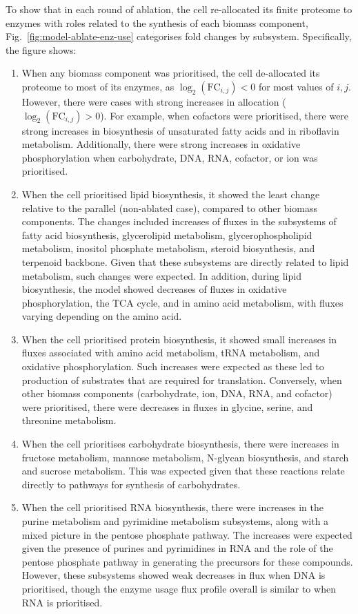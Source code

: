To show that in each round of ablation, the cell re-allocated its finite proteome to enzymes with roles related to the synthesis of each biomass component, Fig.\ \ref{fig:model-ablate-enz-use} categorises fold changes by subsystem.
Specifically, the figure shows:
\begin{enumerate}
  \item When any biomass component was prioritised, the cell de-allocated its proteome to most of its enzymes, as $\log_{2}(\mathrm{FC}_{i,j}) < 0$ for most values of $i, j$.
        However, there were cases with strong increases in allocation ($\log_{2}(\mathrm{FC}_{i,j}) > 0$).
        For example, when cofactors were prioritised, there were strong increases in biosynthesis of unsaturated fatty acids and in riboflavin metabolism.
        Additionally, there were strong increases in oxidative phosphorylation when carbohydrate, DNA, RNA, cofactor, or ion was prioritised.
  \item When the cell prioritised lipid biosynthesis, it showed the least change relative to the parallel (non-ablated case), compared to other biomass components.
        The changes included increases of fluxes in the subsystems of fatty acid biosynthesis, glycerolipid metabolism, glycerophospholipid metabolism, inositol phosphate metabolism, steroid biosynthesis, and terpenoid backbone.
        Given that these subsystems are directly related to lipid metabolism, such changes were expected.
        In addition, during lipid biosynthesis, the model showed decreases of fluxes in oxidative phosphorylation, the TCA cycle, and in amino acid metabolism, with fluxes varying depending on the amino acid.
  \item When the cell prioritised protein biosynthesis, it showed small increases in fluxes associated with amino acid metabolism, tRNA metabolism, and oxidative phosphorylation.
        Such increases were expected as these led to production of substrates that are required for translation.
        Conversely, when other biomass components (carbohydrate, ion, DNA, RNA, and cofactor) were prioritised, there were decreases in fluxes in glycine, serine, and threonine metabolism.
  \item When the cell prioritises carbohydrate biosynthesis, there were increases in fructose metabolism, mannose metabolism, N-glycan biosynthesis, and starch and sucrose metabolism.
        This was expected given that these reactions relate directly to pathways for synthesis of carbohydrates.
  \item When the cell prioritised RNA biosynthesis, there were increases in the purine metabolism and pyrimidine metabolism subsystems, along with a mixed picture in the pentose phosphate pathway.
        The increases were expected given the presence of purines and pyrimidines in RNA and the role of the pentose phosphate pathway in generating the precursors for these compounds.
        However, these subsystems showed weak decreases in flux when DNA is prioritised, though the enzyme usage flux profile overall is similar to when RNA is prioritised.
\end{enumerate}


